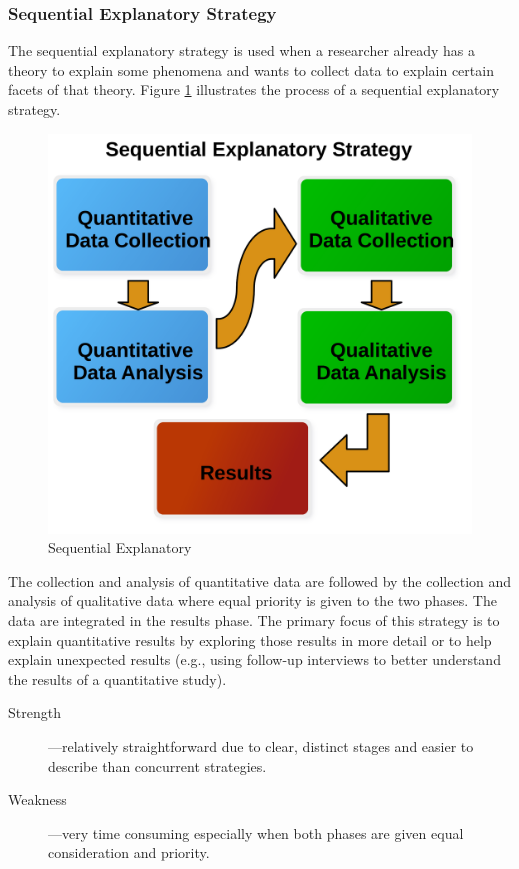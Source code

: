 \subsubsection{Sequential Explanatory Strategy}

The sequential explanatory strategy is used when a researcher already has a theory to explain some phenomena and wants to collect data to explain certain facets of that theory. Figure \ref{14:fig90} illustrates the process of a sequential explanatory strategy. 

\begin{figure}[H]
	\centering
	\includegraphics[width=\maxwidth{.95\linewidth}]{gfx/14-Seq_Explain}
	\caption{Sequential Explanatory}
	\label{14:fig90}
\end{figure}

The collection and analysis of quantitative data are followed by the collection and analysis of qualitative data where equal priority is given to the two phases. The data are integrated in the results phase. The primary focus of this strategy is to explain quantitative results by exploring those results in more detail or to help explain unexpected results (e.g., using follow-up interviews to better understand the results of a quantitative study).

\begin{description}
	\item[Strength]---relatively straightforward due to clear, distinct stages and easier to describe than concurrent strategies.

	\item[Weakness]---very time consuming especially when both phases are given equal consideration and priority.
\end{description}

